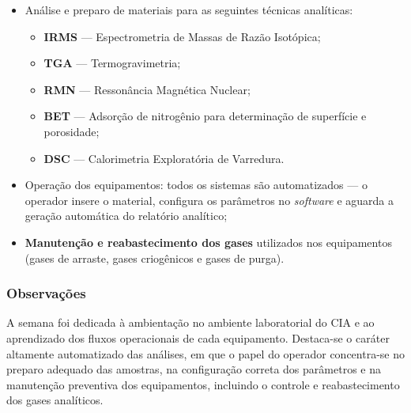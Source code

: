 \begin{itemize}
    \item Análise e preparo de materiais para as seguintes técnicas analíticas:
    \begin{itemize}
        \item \textbf{IRMS} --- Espectrometria de Massas de Razão Isotópica;
        \item \textbf{TGA} --- Termogravimetria;
        \item \textbf{RMN} --- Ressonância Magnética Nuclear;
        \item \textbf{BET} --- Adsorção de nitrogênio para determinação de
              superfície e porosidade;
        \item \textbf{DSC} --- Calorimetria Exploratória de Varredura.
    \end{itemize}
    \item Operação dos equipamentos: todos os sistemas são automatizados ---
          o operador insere o material, configura os parâmetros no \textit{software}
          e aguarda a geração automática do relatório analítico;
    \item \textbf{Manutenção e reabastecimento dos gases} utilizados nos
          equipamentos (gases de arraste, gases criogênicos e gases de purga).
\end{itemize}

\subsubsection*{Observações}

A semana foi dedicada à ambientação no ambiente laboratorial do CIA e ao
aprendizado dos fluxos operacionais de cada equipamento. Destaca-se o
caráter altamente automatizado das análises, em que o papel do operador
concentra-se no preparo adequado das amostras, na configuração correta
dos parâmetros e na manutenção preventiva dos equipamentos, incluindo o
controle e reabastecimento dos gases analíticos.
